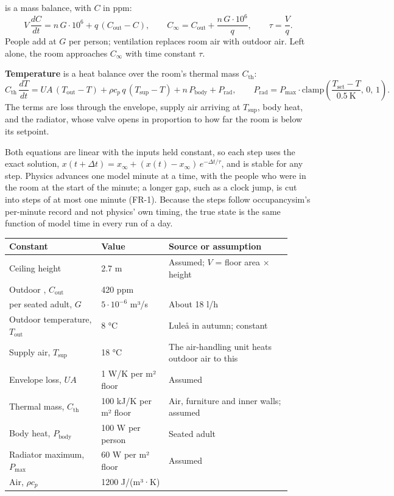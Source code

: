 \textbf{\COtwo{}} is a mass balance, with $C$ in ppm:
\[
V\,\frac{dC}{dt} = n\,G\cdot 10^{6} + q\,(C_{\mathrm{out}} - C),
\qquad
C_{\infty} = C_{\mathrm{out}} + \frac{n\,G\cdot 10^{6}}{q},
\qquad
\tau = \frac{V}{q}.
\]
People add \COtwo{} at $G$ per person; ventilation replaces room air with
outdoor air. Left alone, the room approaches $C_{\infty}$ with time constant
$\tau$.

\textbf{Temperature} is a heat balance over the room's thermal mass
$C_{\mathrm{th}}$:
\[
C_{\mathrm{th}}\,\frac{dT}{dt} = UA\,(T_{\mathrm{out}} - T)
 + \rho c_p\,q\,(T_{\mathrm{sup}} - T) + n\,P_{\mathrm{body}} + P_{\mathrm{rad}},
\qquad
P_{\mathrm{rad}} = P_{\max}\cdot\mathrm{clamp}\!\left(\frac{T_{\mathrm{set}} - T}{0.5\ \mathrm{K}},\,0,\,1\right).
\]
The terms are loss through the envelope, supply air arriving at
$T_{\mathrm{sup}}$, body heat, and the radiator, whose valve opens in
proportion to how far the room is below its setpoint.

Both equations are linear with the inputs held constant, so each step uses the
exact solution, $x(t+\Delta t) = x_{\infty} + (x(t) - x_{\infty})\,e^{-\Delta
t/\tau}$, and is stable for any step. Physics advances one model minute at a
time, with the people who were in the room at the start of the minute; a longer
gap, such as a clock jump, is cut into steps of at most one minute (FR-1).
Because the steps follow occupancysim's per-minute record and not physics' own
timing, the true state is the same function of model time in every run of a
day.

\begin{longtable}[]{@{}L{0.30\linewidth}L{0.22\linewidth}L{0.40\linewidth}@{}}
\toprule
\textbf{Constant} & \textbf{Value} & \textbf{Source or assumption} \\
\midrule
\endhead
Ceiling height & 2.7 m & Assumed; $V$ = floor area × height \\
Outdoor \COtwo{}, $C_{\mathrm{out}}$ & 420 ppm & \\
\COtwo{} per seated adult, $G$ & $5\cdot10^{-6}$ m³/s & About 18 l/h \\
Outdoor temperature, $T_{\mathrm{out}}$ & 8 °C & Luleå in autumn; constant \\
Supply air, $T_{\mathrm{sup}}$ & 18 °C & The air-handling unit heats outdoor air to this \\
Envelope loss, $UA$ & 1 W/K per m² floor & Assumed \\
Thermal mass, $C_{\mathrm{th}}$ & 100 kJ/K per m² floor & Air, furniture and inner walls; assumed \\
Body heat, $P_{\mathrm{body}}$ & 100 W per person & Seated adult \\
Radiator maximum, $P_{\max}$ & 60 W per m² floor & Assumed \\
Air, $\rho c_p$ & 1200 J/(m³·K) & \\
\bottomrule
\end{longtable}

